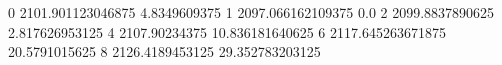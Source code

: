 0 2101.901123046875 4.8349609375
1 2097.066162109375 0.0
2 2099.8837890625 2.817626953125
4 2107.90234375 10.836181640625
6 2117.645263671875 20.5791015625
8 2126.4189453125 29.352783203125
